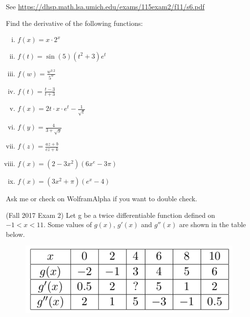 \documentclass[11pt]{exam}
\begin{document}
\begin{questions}
    \begin{solution}
      See \href{https://dhsp.math.lsa.umich.edu/exams/115exam2/f11/s6.pdf}{https://dhsp.math.lsa.umich.edu/exams/115exam2/f11/s6.pdf}
    \end{solution}
  \question Find the derivative of the following functions:
\begin{multicols}{3}
    \begin{enumerate}[i.]
        \item $\displaystyle f(x) = x\cdot2^x$
        \item $\displaystyle f(t) = \sin(5)(t^2+3)e^t$
        \item $\displaystyle f(w) = \frac{w^{3.2}}{5^w}$
        \item $\displaystyle f(t) = \frac{t-3}{t+3}$
        \item $\displaystyle f(x) = 2t\cdot x \cdot e^t-\frac{1}{\sqrt{t}}$
        \item $\displaystyle f(y) = \frac{4}{3+\sqrt{y}}$
        \item $\displaystyle f(z) = \frac{az+b}{cz+k}$
        \item ${\displaystyle f(x) = (2-3x^2)(6x^e-3\pi)}$
        \item $\displaystyle f(x) = (3x^2+\pi)(e^x-4)$
    \end{enumerate}
\end{multicols}
\begin{solution}
  Ask me or check on WolframAlpha if you want to double check.
\end{solution}
\question (Fall 2017 Exam 2) %
  Let g be a twice differentiable function defined on $-1 < x < 11$. Some values of $g(x)$, $g'(x)$ and $g''(x)$ are shown in the table below.
	\begin{figure}[h]
	\centering
	\includegraphics[scale=0.5]{table1.png}	

\end{figure}
\end{questions}
\end{document}
